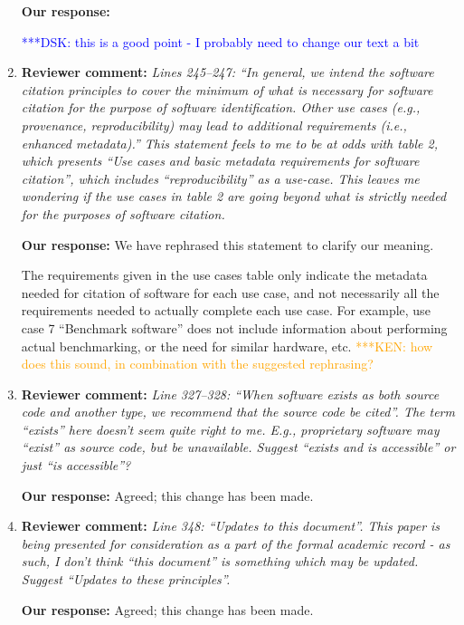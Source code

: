\documentclass{article}
\newcommand{\katznote}[1]{ {\textcolor{blue} { ***DSK: #1 }}} %
\newcommand{\niemnote}[1]{ {\textcolor{orange} { ***KEN: #1 }}} %
\begin{document}
\begin{enumerate}
\textbf{Our response:}

\katznote{this is a good point - I probably need to change our text a bit}

\item \textbf{Reviewer comment:}
\emph{Lines 245--247: ``In general, we intend the software citation principles to cover the minimum of what is necessary for software citation for the purpose of software identification. Other use cases (e.g., provenance, reproducibility) may lead to additional requirements (i.e., enhanced metadata).'' This statement feels to me to be at odds with table 2, which presents ``Use cases and basic metadata requirements for software citation'', which includes ``reproducibility'' as a use-case. This leaves me wondering if the use cases in table 2 are going beyond what is strictly needed for the purposes of software citation.}

\textbf{Our response:}
We have rephrased this statement to clarify our meaning.

The requirements given in the use cases table only indicate the metadata needed for citation of software for each use case, and not necessarily all the requirements needed to actually complete each use case. For example, use case 7 ``Benchmark software'' does not include information about performing actual benchmarking, or the need for similar hardware, etc.
\niemnote{how does this sound, in combination with the suggested rephrasing?}

\item \textbf{Reviewer comment:}
\emph{Line 327--328: ``When software exists as both source code and another type, we recommend that the source code be cited''. The term ``exists'' here doesn't seem quite right to me. E.g., proprietary software may ``exist'' as source code, but be unavailable. Suggest ``exists and is accessible'' or just ``is accessible''?}

\textbf{Our response:}
Agreed; this change has been made.


\item \textbf{Reviewer comment:}
\emph{Line 348: ``Updates to this document''. This paper is being presented for consideration as a part of the formal academic record - as such, I don't think ``this document'' is something which may be updated. Suggest ``Updates to these principles''.}

\textbf{Our response:}
Agreed; this change has been made.

\end{enumerate}

%
%
\end{document}
